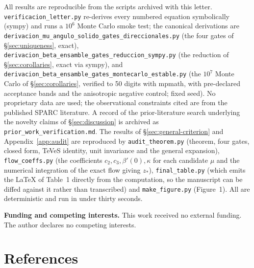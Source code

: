 \documentclass[11pt]{article}
\theoremstyle{plain}
\begin{document}
All results are reproducible from the scripts archived with this letter. \texttt{verificacion\_letter.py} re-derives every numbered equation symbolically (sympy) and runs a $10^6$ Monte Carlo smoke test; the canonical derivations are \texttt{derivacion\_mu\_angulo\_solido\_gates\_direccionales.py} (the four gates of \S\ref{sec:uniqueness}, exact), \texttt{derivacion\_beta\_ensamble\_gates\_reduccion\_sympy.py} (the reduction of \S\ref{sec:corollaries}, exact via sympy), and \texttt{derivacion\_beta\_ensamble\_gates\_montecarlo\_estable.py} (the $10^7$ Monte Carlo of \S\ref{sec:corollaries}, verified to 50 digits with mpmath, with pre-declared acceptance bands and the anisotropic negative control; fixed seed). No proprietary data are used; the observational constraints cited are from the published SPARC literature. A record of the prior-literature search underlying the novelty claims of \S\ref{sec:discussion} is archived as \texttt{prior\_work\_verification.md}. The results of \S\ref{sec:general-criterion} and Appendix~\ref{app:audit} are reproduced by \texttt{audit\_theorem.py} (theorem, four gates, closed form, TeVeS identity, unit invariance and the general expansion), \texttt{flow\_coeffs.py} (the coefficients $c_2,c_3,\beta'(0),\kappa$ for each candidate $\mu$ and the numerical integration of the exact flow giving $z_*$), \texttt{final\_table.py} (which emits the \LaTeX{} of Table~1 directly from the computation, so the manuscript can be diffed against it rather than transcribed) and \texttt{make\_figure.py} (Figure~1). All are deterministic and run in under thirty seconds.

\noindent\textbf{Funding and competing interests.} This work received no external funding. The author declares no competing interests.

\section{References}\label{sec:refs}
\end{document}

